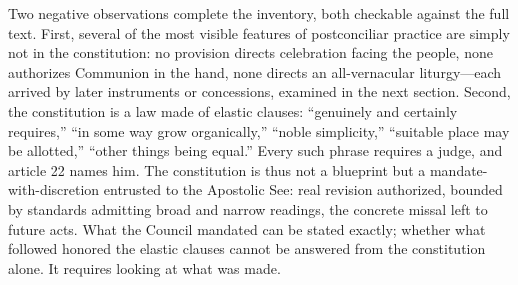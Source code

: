 Two negative observations complete the inventory, both checkable against the full text. First, several of the most visible features of postconciliar practice are simply not in the constitution: no provision directs celebration facing the people, none authorizes Communion in the hand, none directs an all-vernacular liturgy---each arrived by later instruments or concessions, examined in the next section. Second, the constitution is a law made of elastic clauses: ``genuinely and certainly requires,'' ``in some way grow organically,'' ``noble simplicity,'' ``suitable place may be allotted,'' ``other things being equal.'' Every such phrase requires a judge, and article 22 names him. The constitution is thus not a blueprint but a mandate-with-discretion entrusted to the Apostolic See: real revision authorized, bounded by standards admitting broad and narrow readings, the concrete missal left to future acts. What the Council mandated can be stated exactly; whether what followed honored the elastic clauses cannot be answered from the constitution alone. It requires looking at what was made.
